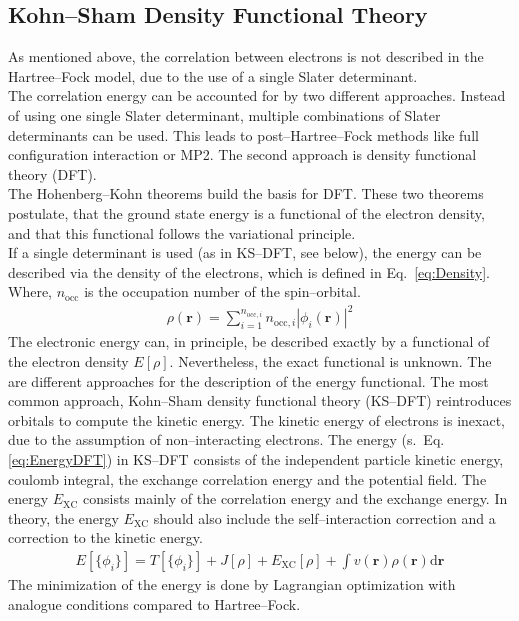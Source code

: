 \subsection{Kohn--Sham Density Functional Theory}
As mentioned above, the correlation between electrons is not described in the Hartree--Fock model,
due to the use of a single Slater determinant.\\
The correlation energy can be accounted for by two different approaches.
Instead of using one single Slater determinant, multiple combinations of Slater determinants can be used.
This leads to post--Hartree--Fock methods like full configuration interaction or MP2.
The second approach is density functional theory (DFT).\\
The Hohenberg--Kohn theorems build the basis for DFT.
These two theorems postulate, that the ground state energy is a functional of the electron density,
and that this functional follows the variational principle.\\
If a single determinant is used (as in KS--DFT, see below), the energy can be described via the density of the electrons,
which is defined in Eq.~\eqref{eq:Density}.
Where, $n_\mathrm{occ}$ is the occupation number of the spin--orbital.
\begin{align}
	\label{eq:Density}
	\rho(\textbf{r}) =  \sum_{i=1}^{n_{\mathrm{occ},i}} n_{\mathrm{occ},i} |\phi_i(\textbf{r})|^2
\end{align}
The electronic energy can, in principle, be described exactly by a functional of the electron density $E[\rho]$. 
Nevertheless, the exact functional is unknown. The are different approaches for the description of the energy functional.
The most common approach, Kohn--Sham density functional theory (KS--DFT) reintroduces orbitals to compute the kinetic energy.
The kinetic energy of electrons is inexact, due to the assumption of non--interacting electrons.
The energy (s.~Eq.\eqref{eq:EnergyDFT}) in KS--DFT consists of the independent particle kinetic energy, coulomb integral,
the exchange correlation energy and the potential field.
The energy $E_\mathrm{XC}$ consists mainly of the correlation energy and the exchange energy.
In theory, the energy $E_\mathrm{XC}$ should also include the \mbox{self--interaction} correction and a correction to the kinetic energy.
\begin{align}
	\label{eq:EnergyDFT}
	E[\{\phi_i\}] = T[\{\phi_i\}] + J[\rho] + E_\mathrm{XC}[\rho] + \int v(\textbf{r}) \rho(\textbf{r}) \mathrm{d}\textbf{r}
\end{align}
The minimization of the energy is done by Lagrangian optimization with analogue conditions compared to Hartree--Fock.
